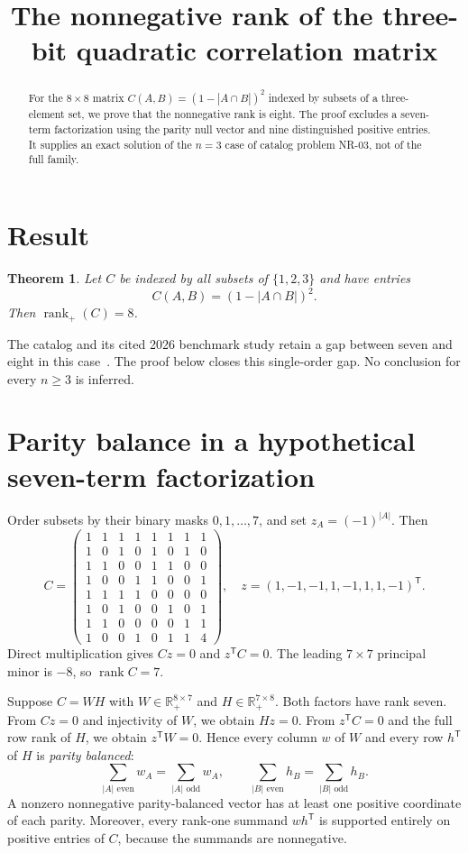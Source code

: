 \documentclass[11pt]{article}
\title{The nonnegative rank of the three-bit quadratic correlation matrix}
\author{}\date{}
\newtheorem{theorem}{Theorem}
\newcommand{\rank}{\operatorname{rank}}
\begin{document}
\maketitle
\begin{abstract}
For the $8\times8$ matrix $C(A,B)=(1-|A\cap B|)^2$ indexed by subsets of a three-element set, we prove that the nonnegative rank is eight. The proof excludes a seven-term factorization using the parity null vector and nine distinguished positive entries. It supplies an exact solution of the $n=3$ case of catalog problem NR-03, not of the full family.
\end{abstract}

\section{Result}
\begin{theorem}\label{thm:main}
Let $C$ be indexed by all subsets of $\{1,2,3\}$ and have entries
\[
 C(A,B)=(1-|A\cap B|)^2.
\]
Then $\rank_+(C)=8$.
\end{theorem}
The catalog and its cited 2026 benchmark study retain a gap between seven and eight in this case~\cite{catalog,bvg}. The proof below closes this single-order gap. No conclusion for every $n\geq3$ is inferred.

\section{Parity balance in a hypothetical seven-term factorization}
Order subsets by their binary masks $0,1,\ldots,7$, and set $z_A=(-1)^{|A|}$. Then
\[
 C=\begin{pmatrix}
1&1&1&1&1&1&1&1\\
1&0&1&0&1&0&1&0\\
1&1&0&0&1&1&0&0\\
1&0&0&1&1&0&0&1\\
1&1&1&1&0&0&0&0\\
1&0&1&0&0&1&0&1\\
1&1&0&0&0&0&1&1\\
1&0&0&1&0&1&1&4
\end{pmatrix},\quad
 z=(1,-1,-1,1,-1,1,1,-1)^{\mathsf T}.
\]
Direct multiplication gives $Cz=0$ and $z^{\mathsf T}C=0$. The leading $7\times7$ principal minor is $-8$, so $\rank C=7$.

Suppose $C=WH$ with $W\in\mathbb R_+^{8\times7}$ and $H\in\mathbb R_+^{7\times8}$. Both factors have rank seven. From $Cz=0$ and injectivity of $W$, we obtain $Hz=0$. From $z^{\mathsf T}C=0$ and the full row rank of $H$, we obtain $z^{\mathsf T}W=0$. Hence every column $w$ of $W$ and every row $h^{\mathsf T}$ of $H$ is \emph{parity balanced}:
\[
 \sum_{|A|\text{ even}}w_A=\sum_{|A|\text{ odd}}w_A,
 \qquad
 \sum_{|B|\text{ even}}h_B=\sum_{|B|\text{ odd}}h_B.
\]
A nonzero nonnegative parity-balanced vector has at least one positive coordinate of each parity. Moreover, every rank-one summand $wh^{\mathsf T}$ is supported entirely on positive entries of $C$, because the summands are nonnegative.
\end{document}
